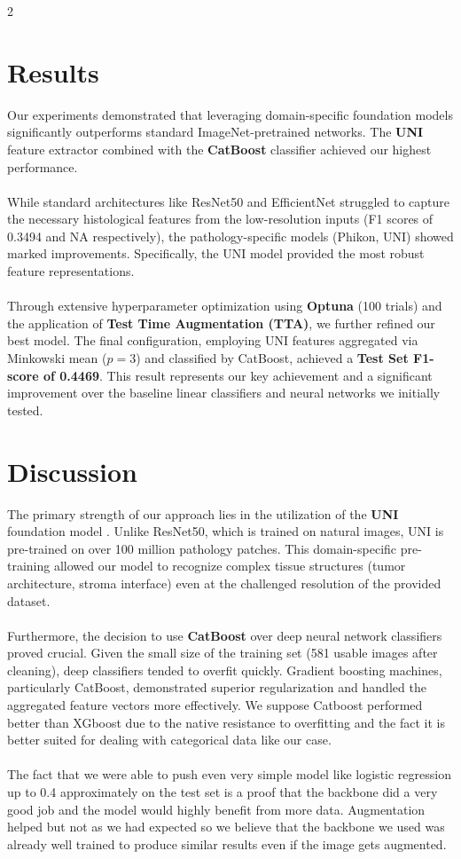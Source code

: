 \documentclass[11pt]{article}
\begin{document}
\begin{multicols}{2}
        \section{Results}
        Our experiments demonstrated that leveraging domain-specific foundation models significantly outperforms standard ImageNet-pretrained networks. The \textbf{UNI} feature extractor combined with the \textbf{CatBoost} classifier achieved our highest performance.
        \\\\
        While standard architectures like ResNet50 and EfficientNet struggled to capture the necessary histological features from the low-resolution inputs (F1 scores of 0.3494 and NA respectively), the pathology-specific models (Phikon, UNI) showed marked improvements. Specifically, the UNI model provided the most robust feature representations.
        \\\\
        Through extensive hyperparameter optimization using \textbf{Optuna} (100 trials) and the application of \textbf{Test Time Augmentation (TTA)}, we further refined our best model. The final configuration, employing UNI features aggregated via Minkowski mean ($p=3$) and classified by CatBoost, achieved a \textbf{Test Set F1-score of 0.4469}. This result represents our key achievement and a significant improvement over the baseline linear classifiers and neural networks we initially tested.
        
        \section{Discussion}
        The primary strength of our approach lies in the utilization of the \textbf{UNI} foundation model \cite{chen2024towards-ccc}. Unlike ResNet50, which is trained on natural images, UNI is pre-trained on over 100 million pathology patches. This domain-specific pre-training allowed our model to recognize complex tissue structures (tumor architecture, stroma interface) even at the challenged resolution of the provided dataset.
        \\\\
        Furthermore, the decision to use \textbf{CatBoost} over deep neural network classifiers proved crucial. Given the small size of the training set (581 usable images after cleaning), deep classifiers tended to overfit quickly. Gradient boosting machines, particularly CatBoost, demonstrated superior regularization and handled the aggregated feature vectors more effectively. We suppose Catboost performed better than XGboost due to the native resistance to overfitting and the fact it is better suited for dealing with categorical data like our case.
        \\\\
        The fact that we were able to push even very simple model like logistic regression up to 0.4 approximately on the test set is a proof that the backbone did a very good job and the model would highly benefit from more data. Augmentation helped but not as we had expected so we believe that the backbone we used was already well trained to produce similar results even if the image gets augmented. 
    

\end{multicols}
\end{document}

